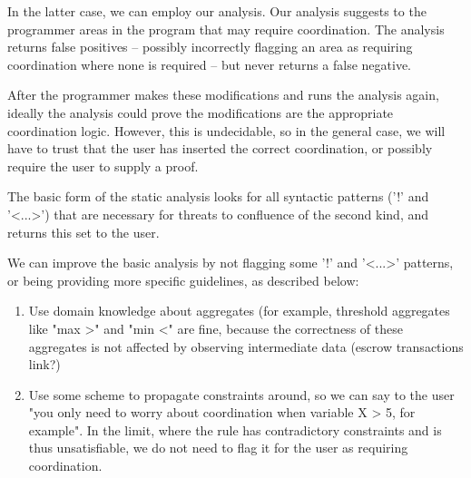 In the latter case, we can employ our analysis.  Our analysis suggests to the
programmer areas in the program that may require coordination.  The analysis
returns false positives -- possibly incorrectly flagging an area as requiring
coordination where none is required -- but never returns a false negative.

After the programmer makes these modifications and runs the analysis again, ideally
the analysis could prove the modifications are the appropriate coordination logic.
However, this is undecidable, so in the general case, we will have to trust that the
user has inserted the correct coordination, or possibly require the user to supply a
proof.

The basic form of the static analysis looks for all syntactic patterns ('!' and
'<...>') that are necessary for threats to confluence of the second kind, and
returns this set to the user.

We can improve the basic analysis by not flagging some '!' and '<...>' patterns, or being providing more specific guidelines, as described below:

\begin{enumerate}
%
\item Use domain knowledge about aggregates (for example, threshold aggregates
like "max >" and "min <" are fine, because the correctness of these aggregates
is not affected by observing intermediate data (escrow transactions link?)
%
\item Use some scheme to propagate constraints around, so we can say to the
user "you only need to worry about coordination when variable X > 5, for
example".  In the limit, where the rule has contradictory constraints and is
thus unsatisfiable, we do not need to flag it for the user as requiring
coordination.
%
\end{enumerate}
